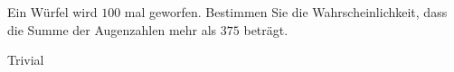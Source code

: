 \begin{exercise}

Ein Würfel wird $100$ mal geworfen. Bestimmen Sie die Wahrscheinlichkeit, dass die Summe der Augenzahlen mehr als $375$ beträgt.

\end{exercise}

\begin{solution}

Trivial

\end{solution}
